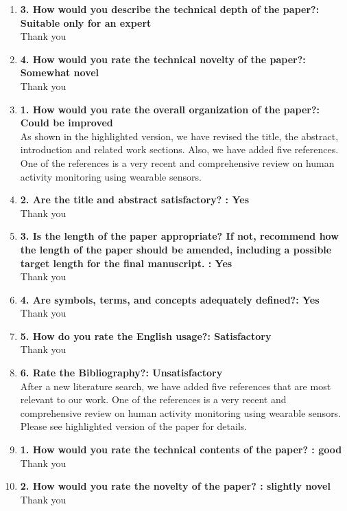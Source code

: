 \documentclass[11pt]{article}
\begin{document}
\begin{enumerate}
\item\textbf{3. How would you describe the technical depth of the paper?: Suitable only for an expert}\\
Thank you

\item\textbf{4. How would you rate the technical novelty of the paper?: Somewhat novel}\\
Thank you

\item \textbf{1. How would you rate the overall organization of the paper?: Could be improved
}\\
As shown in the highlighted version, we have revised the title, the abstract, introduction and related work sections. Also, we have added five references. One of the references is a very recent and comprehensive review on human activity monitoring using wearable sensors.
\item \textbf{2. Are the title and abstract satisfactory? : Yes
}\\
Thank you

\item\textbf{3. Is the length of the paper appropriate? If not, recommend how the length of the paper should be amended, including a possible target length for the final manuscript. : Yes}\\
Thank you

\item\textbf{4. Are symbols, terms, and concepts adequately defined?: Yes}\\
Thank you

\item\textbf{5. How do you rate the English usage?: Satisfactory}\\
Thank you

\item\textbf{6. Rate the Bibliography?: Unsatisfactory}\\
After a new literature search, we have added five references that are most relevant to our work. One of the references is a very recent and comprehensive review on human activity monitoring using wearable sensors. Please see highlighted version of the paper for details.

\item\textbf{1. How would you rate the technical contents of the paper? : good}\\
Thank you

\item \textbf{2. How would you rate the novelty of the paper? : slightly novel}\\
Thank you


\end{enumerate}
\end{document}
